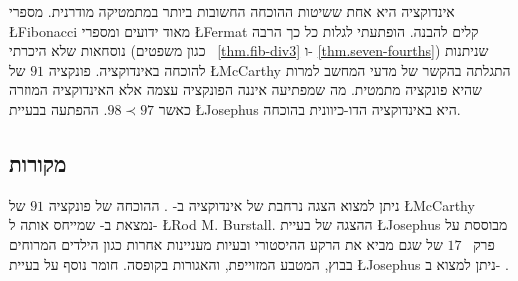 אינדוקציה היא אחת ששיטות ההוכחה החשובות ביותר במתמטיקה מודרנית. מספרי
\L{Fibonacci}
מאוד ידועים ומספרי 
\L{Fermat}
קלים להבנה. הופתעתי לגלות כל כך הרבה נוסחאות שלא היכרתי (כגון משפטים%
~\ref{thm.fib-div3}
ו-%
\ref{thm.seven-fourths})
שניתנות להוכחה באינדוקציה. פונקציה
$91$
של
\L{McCarthy}
התגלתה בהקשר של מדעי המחשב למרות שהיא פונקציה מתמטית. מה שמפתיעה איננה הפונקציה עצמה אלא האינדוקציה המוזרה כאשר 
$98\prec 97$. 
ההפתעה בבעיית
\L{Josephus}
היא באינדוקציה הדו-כיוונית בהוכחה.

\subsection*{מקורות}

ניתן למצוא הצגה נרחבת של אינדוקציה ב-%
\cite{gunderson}.
ההוכחה של פונקציה 
$91$
של
\L{McCarthy}
נמצאת ב-%
\cite{manna}
שמייחס אותה ל-%
\L{Rod M. Burstall}.
ההצגה של בעיית 
\L{Josephus}
מבוססת על פרק~%
$17$
של
\cite{gunderson}
שגם מביא את הרקע ההיסטורי ובעיות מעניינות אחרות כגון הילדים המרוחים בבוץ, המטבע המזוייפת, והאגורות בקופסה. חומר נוסף על בעיית
\L{Josephus}
ניתן למצוא ב-%
\cite{schumer,wiki:josephus}.
